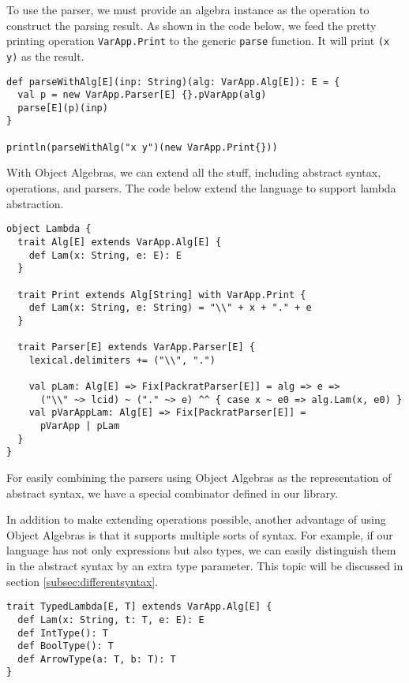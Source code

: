 To use the parser, we must provide an algebra instance as the operation to construct the parsing result. As shown in the code below, we feed the pretty printing operation \lstinline{VarApp.Print} to the generic \lstinline{parse} function. It will print \lstinline{(x y)} as the result.

\begin{lstlisting}
def parseWithAlg[E](inp: String)(alg: VarApp.Alg[E]): E = {
  val p = new VarApp.Parser[E] {}.pVarApp(alg)
  parse[E](p)(inp)
}

println(parseWithAlg("x y")(new VarApp.Print{}))
\end{lstlisting}

With Object Algebras, we can extend all the stuff, including abstract syntax, operations, and parsers. The code below extend the language to support lambda abstraction.

\begin{lstlisting}
object Lambda {
  trait Alg[E] extends VarApp.Alg[E] {
    def Lam(x: String, e: E): E
  }

  trait Print extends Alg[String] with VarApp.Print {
    def Lam(x: String, e: String) = "\\" + x + "." + e
  }

  trait Parser[E] extends VarApp.Parser[E] {
    lexical.delimiters += ("\\", ".")

    val pLam: Alg[E] => Fix[PackratParser[E]] = alg => e =>
      ("\\" ~> lcid) ~ ("." ~> e) ^^ { case x ~ e0 => alg.Lam(x, e0) }
    val pVarAppLam: Alg[E] => Fix[PackratParser[E]] =
      pVarApp | pLam
  }
}
\end{lstlisting}

For easily combining the parsers using Object Algebras as the representation of abstract syntax, we have a special combinator  defined in our library.

In addition to make extending operations possible, another advantage of using Object Algebras is that it supports multiple sorts of syntax. For example, if our language has not only expressions but also types, we can easily distinguish them in the abstract syntax by an extra type parameter. This topic will be discussed in section \ref{subsec:differentsyntax}.

\begin{lstlisting}
trait TypedLambda[E, T] extends VarApp.Alg[E] {
  def Lam(x: String, t: T, e: E): E
  def IntType(): T
  def BoolType(): T
  def ArrowType(a: T, b: T): T
}
\end{lstlisting}



